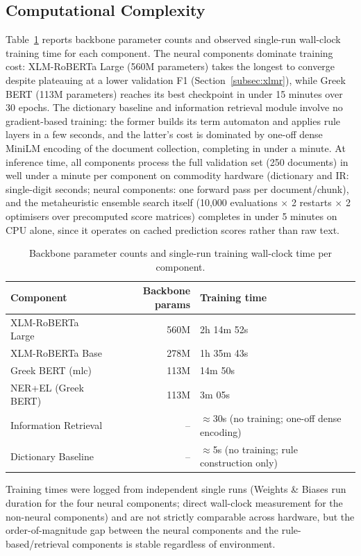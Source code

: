 \subsection{Computational Complexity}
\label{subsec:complexity}

Table~\ref{tab:complexity} reports backbone parameter counts and observed single-run
wall-clock training time for each component. The neural components dominate training
cost: XLM-RoBERTa Large (560M parameters) takes the longest to converge despite
plateauing at a lower validation F1 (Section~\ref{subsec:xlmr}), while Greek BERT
(113M parameters) reaches its best checkpoint in under 15 minutes over 30 epochs.
The dictionary baseline and information retrieval module involve no gradient-based
training: the former builds its term automaton and applies rule layers in a few
seconds, and the latter's cost is dominated by one-off dense MiniLM encoding of the
document collection, completing in under a minute. At inference time, all components
process the full validation set (250 documents) in well under a minute per
component on commodity hardware (dictionary and IR: single-digit seconds; neural
components: one forward pass per document/chunk), and the metaheuristic ensemble
search itself (10,000 evaluations $\times$ 2 restarts $\times$ 2 optimisers over
precomputed score matrices) completes in under 5 minutes on CPU alone, since it
operates on cached prediction scores rather than raw text.

\begin{table}[h]
\centering
\caption{Backbone parameter counts and single-run training wall-clock time per component.}
\label{tab:complexity}
\begin{tabular}{lrl}
\toprule
Component & Backbone params & Training time \\
\midrule
XLM-RoBERTa Large     & 560M & 2h 14m 52s \\
XLM-RoBERTa Base      & 278M & 1h 35m 43s \\
Greek BERT (mlc)      & 113M & 14m 50s \\
NER+EL (Greek BERT)   & 113M & 3m 05s \\
Information Retrieval & --   & $\approx$30s (no training; one-off dense encoding) \\
Dictionary Baseline   & --   & $\approx$5s (no training; rule construction only) \\
\bottomrule
\end{tabular}
\end{table}

Training times were logged from independent single runs (Weights \& Biases run
duration for the four neural components; direct wall-clock measurement for the
non-neural components) and are not strictly comparable across hardware, but the
order-of-magnitude gap between the neural components and the rule-based/retrieval
components is stable regardless of environment.

